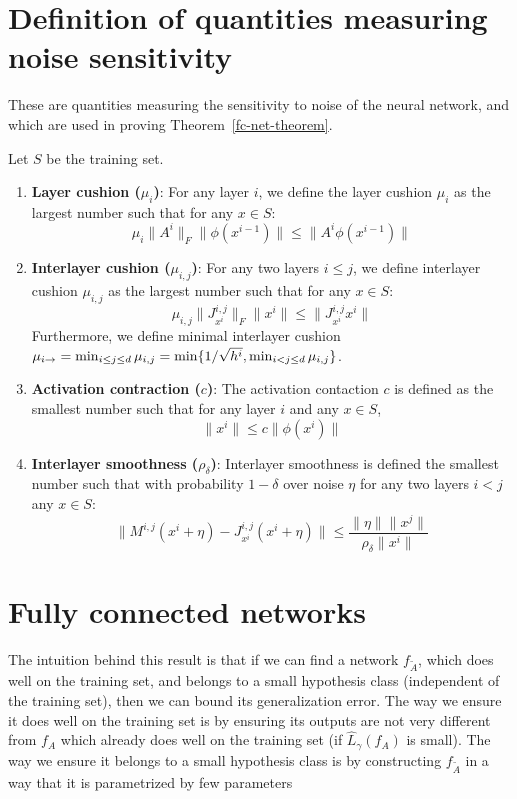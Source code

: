 \section{Definition of quantities measuring noise sensitivity}

These are quantities measuring the sensitivity to noise of the neural network, and which are used in proving Theorem~\ref{fc-net-theorem}. 

    Let $S$ be the training set.
    \begin{enumerate}
        \item {\bf Layer cushion ($\mu_{i}$)}: For any layer $i$, we define the layer cushion $\mu_i$ as the largest number such that for any $x\in S$:
        $$
        \mu_{i}\|A^i\|_F\|\phi(x^{i-1})\| \leq \|A^i\phi(x^{i-1})\|
        $$
        \item {\bf Interlayer cushion ($\mu_{i,j}$)}: For any two layers $i\leq j$, we define interlayer cushion $\mu_{i,j}$ as the largest number such that for any $x\in S$:
        $$
        \mu_{i,j}\|J^{i,j}_{x^i}\|_F\|x^i\| \leq  \|J^{i,j}_{x^i}x^i\|
        $$
        Furthermore, we define minimal interlayer cushion $\mu_{i\rightarrow} = \min_{i\leq j\leq d} \mu_{i,j} = \min\{1/\sqrt{h^i},\min_{i< j\leq d} \mu_{i,j}\}$.
        \item {\bf Activation contraction ($c$)}: The activation contaction $c$ is defined as the smallest number such that for any layer $i$ and any $x\in S$,
        $$
        \|x^i\| \leq c \|\phi(x^i)\|
        $$
        \item {\bf Interlayer smoothness ($\rho_{\delta}$)}: Interlayer smoothness is defined the smallest number such that with probability $1-\delta$ over noise $\eta$ for any two layers $i<j$ any $x\in S$:
        $$
        \|M^{i,j}(x^{i}+\eta)-J_{x^i}^{i,j}(x^{i}+\eta)\| \leq \frac{\|\eta\|\|x^{j}\|}{\rho_{\delta}\|x^{i}\|}
        $$
    \end{enumerate}


\section{Fully connected networks}

The intuition behind this result is that if we can find a network $f_{\tilde{A}}$, which does well on the training set, and belongs to a small hypothesis class (independent of the training set), then we can bound its generalization error. The way we ensure it does well on the training set is by ensuring its outputs are not very different from $f_A$ which already does well on the training set (if $\hat{L}_{\gamma}(f_A)$ is small). The way we ensure it belongs to a small hypothesis class is by constructing $f_{\tilde{A}}$ in a way that it is parametrized by few parameters

